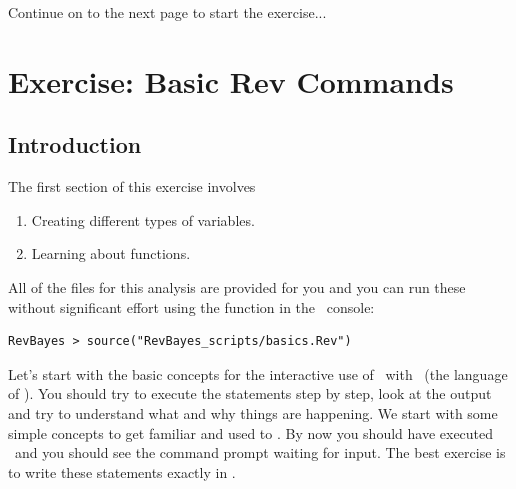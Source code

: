 %



\vspace{5mm}

{\begin{framed}
\begin{center}
Continue on to the next page to start the exercise...
\end{center}
\end{framed}}






%
%
\newpage
\FloatBarrier
\section{Exercise: Basic Rev Commands}

\subsection{Introduction}

The first section of this exercise involves 
\begin{enumerate}
\item Creating different types of variables.
\item Learning about functions. 
\end{enumerate}

All of the files for this analysis are provided for you and you can run these without significant effort using the  function in the \RevBayes~console:
{\tt \begin{snugshade*}
\begin{lstlisting}
RevBayes > source("RevBayes_scripts/basics.Rev")
\end{lstlisting}
\end{snugshade*}}


Let's start with the basic concepts for the interactive use of \RevBayes~with \Rev~(the language of \RevBayes). 
You should try to execute the statements step by step, look at the output and try to understand what and why things are happening. 
We start with some simple concepts to get familiar and used to \RevBayes. 
By now you should have executed \RevBayes~and you should see the command prompt waiting for input. 
The best exercise is to write these statements exactly in \RevBayes. 

